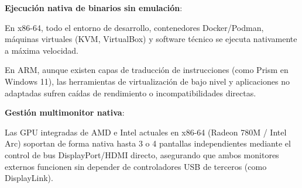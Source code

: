 \documentclass[11.5pt]{article}
\begin{document}
	\textbf{Ejecución nativa de binarios sin emulación}:
	
	En x86-64, todo el entorno de desarrollo, contenedores Docker/Podman, máquinas virtuales (KVM, VirtualBox) y software técnico se ejecuta nativamente a máxima velocidad.
	
	En ARM, aunque existen capas de traducción de instrucciones (como Prism en Windows 11), las herramientas de virtualización de bajo nivel y aplicaciones no adaptadas sufren caídas de rendimiento o incompatibilidades directas.
	
	\textbf{Gestión multimonitor nativa}:
	
	Las GPU integradas de AMD e Intel actuales en x86-64 (Radeon 780M / Intel Arc) soportan de forma nativa hasta 3 o 4 pantallas independientes mediante el control de bus DisplayPort/HDMI directo, asegurando que ambos monitores externos funcionen sin depender de controladores USB de terceros (como DisplayLink).
	
\end{document}
